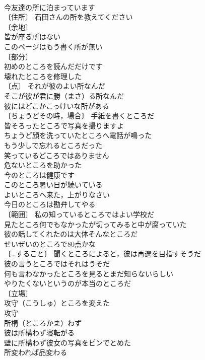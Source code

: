 \documentclass[8pt]{extreport}
\begin{document}
\begin{CJK}{UTF8}{min}
\\	今友達の所に泊まっています 
\\	〔住所〕 石田さんの所を教えてください 
\\	〔余地〕
\\	皆が座る所はない 
\\	このページはもう書く所が無い 
\\	〔部分〕
\\	初めのところを読んだだけです 
\\	壊れたところを修理した 
\\	〔点〕 それが彼のよい所なんだ 
\\	そこが彼が君に勝（まさ）る所なんだ 
\\	彼にはどこかこっけいな所がある 
\\	〔ちょうどその時，場合〕 手紙を書くところだ 
\\	皆そろったところで写真を撮りますよ 
\\	ちょうど顔を洗っていたところへ電話が鳴った 
\\	もう少しで忘れるところだった 
\\	笑っているどころではありません 
\\	危ないところを助かった 
\\	今のところは健康です 
\\	このところ暑い日が続いている 
\\	よいところへ来た，上がりなさい 
\\	今日のところは勘弁してやる 
\\	〔範囲〕 私の知っているところではよい学校だ 
\\	見たところ何でもなかったが切ってみると中が腐っていた 
\\	彼の話してくれたのは大体そんなところだ 
\\	せいぜいのところで80点かな 
\\	〔…すること〕 聞くところによると，彼は再選を目指すそうだ 
\\	彼の言うところではそれはうそだ 
\\	何も言わなかったところを見るとまだ知らないらしい 
\\	やりたくないというのが本当のところだ 
\\	〔立場〕
\\	攻守（こうしゅ）ところを変えた 
\\	攻守　
\\	所構（ところかま）わず　
\\	彼は所構わず寝転がる 
\\	壁に所構わず彼女の写真をピンでとめた 
\\	所変われば品変わる 

\end{CJK}
\end{document}
